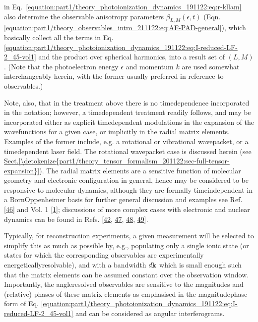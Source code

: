 \documentclass[letterpaper,table,10pt,english]{jupyterBook}
\begin{document}
in Eq. \eqref{equation:part1/theory_photoionization_dynamics_191122:eq:r-kllam} also determine the observable anisotropy
parameters \(\beta_{L,M}(\epsilon,t)\) (Eqn.
\eqref{equation:part1/theory_observables_intro_211122:eq:AF-PAD-general}), which basically collect all the terms in Eq. \eqref{equation:part1/theory_photoionization_dynamics_191122:eq:I-reduced-LF-2_45-vol1} and the product over spherical harmonics, into a result set of \((L,M)\). (Note that the photoelectron energy
\(\epsilon\) and momentum \(k\) are used somewhat interchangeably herein,
with the former usually preferred in reference to observables.)

\sphinxAtStartPar
Note, also, that in the treatment above there is no time\sphinxhyphen{}dependence
incorporated in the notation; however, a time\sphinxhyphen{}dependent treatment
readily follows, and may be incorporated either as explicit
time\sphinxhyphen{}dependent modulations in the expansion of the wavefunctions for a
given case, or implicitly in the radial matrix elements. Examples of the
former include, e.g. a rotational or vibrational wavepacket, or a
time\sphinxhyphen{}dependent laser field. The rotational wavepacket case is discussed
herein (see \hyperref[\detokenize{part1/theory_tensor_formalism_201122:sec-full-tensor-expansion}]{Sect.\@ \ref{\detokenize{part1/theory_tensor_formalism_201122:sec-full-tensor-expansion}}}). The radial matrix elements are
a sensitive function of molecular geometry and electronic configuration
in general, hence may be considered to be responsive to molecular
dynamics, although they are formally time\sphinxhyphen{}independent in a
Born\sphinxhyphen{}Oppenheimer basis \sphinxhyphen{} for further general discussion and examples see
Ref. {[}\hyperlink{cite.backmatter/bibliography:id867}{46}{]} and  Vol. 1 {[}\hyperlink{cite.backmatter/bibliography:id613}{1}{]}; discussions of more
complex cases with electronic and nuclear dynamics can be found in Refs.
{[}\hyperlink{cite.backmatter/bibliography:id791}{42}, \hyperlink{cite.backmatter/bibliography:id457}{47}, \hyperlink{cite.backmatter/bibliography:id815}{48}, \hyperlink{cite.backmatter/bibliography:id812}{49}{]}.

\sphinxAtStartPar
Typically, for reconstruction experiments, a given measurement will be
selected to simplify this as much as possible by, e.g., populating only
a single ionic state (or states for which the corresponding observables
are experimentally energetically\sphinxhyphen{}resolvable), and with a bandwidth
\(d\bf{k}\) which is small enough such that the matrix elements can be
assumed constant over the observation window. Importantly, the angle\sphinxhyphen{}resolved observables are
sensitive to the magnitudes and (relative) phases of these matrix
elements \sphinxhyphen{} as emphasised in the magnitude\sphinxhyphen{}phase form of Eq. \eqref{equation:part1/theory_photoionization_dynamics_191122:eq:I-reduced-LF-2_45-vol1} \sphinxhyphen{} and can be considered as angular interferograms.
\end{document}
